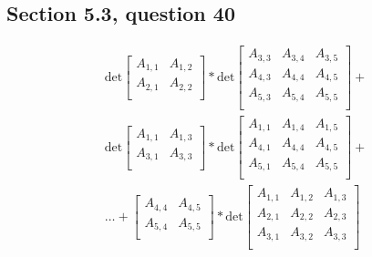 \documentclass[a4paper,11pt]{article}
\begin{document}
\subsection*{Section 5.3, question 40}
\begin{align}
\text{det}
\begin{bmatrix}
A_{1,1} & A_{1,2} \\
A_{2,1} & A_{2,2} \\
\end{bmatrix}
*
\text{det}
\begin{bmatrix}
A_{3,3} & A_{3,4} & A_{3,5} \\
A_{4,3} & A_{4,4} & A_{4,5} \\
A_{5,3} & A_{5,4} & A_{5,5} \\
\end{bmatrix}+ \\
\text{det}
\begin{bmatrix}
A_{1,1} & A_{1,3} \\
A_{3,1} & A_{3,3} \\
\end{bmatrix}
*
\text{det}
\begin{bmatrix}
A_{1,1} & A_{1,4} & A_{1,5} \\
A_{4,1} & A_{4,4} & A_{4,5} \\
A_{5,1} & A_{5,4} & A_{5,5} \\
\end{bmatrix}+ \\
\dots
+
\begin{bmatrix}
A_{4,4} & A_{4,5} \\
A_{5,4} & A_{5,5} \\
\end{bmatrix}
*
\text{det}
\begin{bmatrix}
A_{1,1} & A_{1,2} & A_{1,3} \\
A_{2,1} & A_{2,2} & A_{2,3} \\
A_{3,1} & A_{3,2} & A_{3,3} \\
\end{bmatrix} \\
\end{align}
\end{document}
